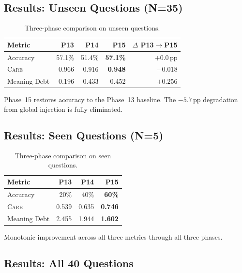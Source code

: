 \documentclass[11pt,a4paper]{article}
\newcommand{\care}{\textsc{Care}\xspace}
\newcommand{\pp}{\,pp\xspace}
\begin{document}
\subsection{Results: Unseen Questions (N=35)}

\begin{table}[H]
\centering\small
\caption{Three-phase comparison on unseen questions.}\label{tab:p15unseen}
\begin{tabular}{@{}lrrrr@{}}
\toprule
\textbf{Metric} & \textbf{P13} & \textbf{P14} & \textbf{P15} &
  \textbf{$\Delta$ P13$\to$P15} \\
\midrule
Accuracy     & 57.1\% & 51.4\% & \textbf{57.1\%} & $+0.0$\pp \\
\care        & 0.966  & 0.916  & \textbf{0.948}  & $-0.018$ \\
Meaning Debt & 0.196  & 0.433  & 0.452            & $+0.256$ \\
\bottomrule
\end{tabular}
\end{table}

Phase~15 restores accuracy to the Phase~13 baseline.  The $-5.7$\pp
degradation from global injection is fully eliminated.

\subsection{Results: Seen Questions (N=5)}

\begin{table}[H]
\centering\small
\caption{Three-phase comparison on seen questions.}\label{tab:p15seen}
\begin{tabular}{@{}lrrr@{}}
\toprule
\textbf{Metric} & \textbf{P13} & \textbf{P14} & \textbf{P15} \\
\midrule
Accuracy     & 20\%  & 40\%  & \textbf{60\%} \\
\care        & 0.539 & 0.635 & \textbf{0.746} \\
Meaning Debt & 2.455 & 1.944 & \textbf{1.602} \\
\bottomrule
\end{tabular}
\end{table}

Monotonic improvement across all three metrics through all three phases.

\subsection{Results: All 40 Questions}
\end{document}
